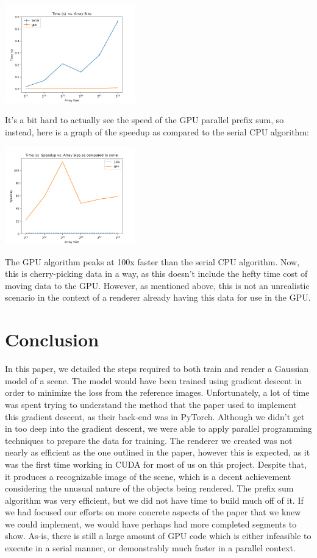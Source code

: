 \documentclass[12pt, a4paper, twocolumn]{article}
\begin{document}
\includegraphics[width = 0.425\textwidth]{time vs arr_size-serial-gpu.png}

It's a bit hard to actually see the speed of the GPU parallel prefix sum, so instead, here is a graph of the speedup as compared to the serial CPU algorithm:

\includegraphics[width = 0.425\textwidth]{Speeduptime vs arr_size-serial-gpu.png}

The GPU algorithm peaks at 100x faster than the serial CPU algorithm. Now, this is cherry-picking data in a way, as this doesn't include the hefty time cost of moving data to the GPU. However, as mentioned above, this is not an unrealistic scenario in the context of a renderer already having this data for use in the GPU.

\section{Conclusion}
In this paper, we detailed the steps required to both train and render a Gaussian model of a scene. The model would have been trained using gradient descent in order to minimize the loss from the reference images. Unfortunately, a lot of time was spent trying to understand the method that the paper used to implement this gradient descent, as their back-end was in PyTorch. Although we didn't get in too deep into the gradient descent, we were able to apply parallel programming techniques to prepare the data for training. The renderer we created was not nearly as efficient as the one outlined in the paper, however this is expected, as it was the first time working in CUDA for most of us on this project. Despite that, it produces a recognizable image of the scene, which is a decent achievement considering the unusual nature of the objects being rendered. The prefix sum algorithm was very efficient, but we did not have time to build much off of it. If we had focused our efforts on more concrete aspects of the paper that we knew we could implement, we would have perhaps had more completed segments to show. As-is, there is still a large amount of GPU code which is either infeasible to execute in a serial manner, or demonstrably much faster in a parallel context.
\end{document}
